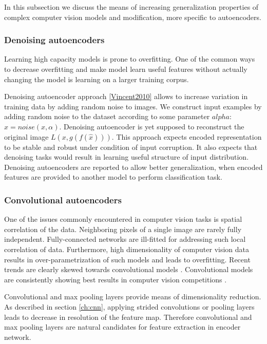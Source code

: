 In this subsection we discuss the means of increasing generalization properties of complex computer vision models and modification, more specific to autoencoders.

\subsubsection{Denoising autoencoders}

Learning high capacity models is prone to overfitting.
One of the common ways to decrease overfitting and make model learn useful features without actually changing the model is learning on a larger training corpus.

Denoising autoencoder approach \ref{Vincent2010} allows to increase variation in training data by adding random noise to images. We construct input examples by adding random noise to the dataset according to some parameter $alpha$: $\hat{x}=noise(x, \alpha)$.
Denoising autoencoder is yet supposed to reconstruct  the original image $L(x, g(f(\hat{x})))$.
This approach expects encoded representation to be stable and robust under condition of input corruption.
It also expects that denoising tasks would result in learning useful structure of input distribution.
Denoising autoencoders are reported to allow better generalization, when encoded features are provided to another model to perform classification task.

\subsubsection{Convolutional autoencoders}

One of the issues commonly encountered in computer vision tasks is spatial correlation of the data.
Neighboring pixels of a single image are rarely fully independent.
Fully-connected networks are ill-fitted for addressing such local correlation of data.
Furthermore, high dimensionality of computer vision data results in over-parametrization of such models and leads to overfitting.
Recent trends are clearly skewed towards convolutional models \cite{He2015, Szegedy2016}.
Convolutional models are consistently showing best results in computer vision competitions \cite{ILSVRC15, Zhou2016}.

Convolutional and max pooling layers provide means of dimensionality reduction.
As described in section \ref{ch:cnn}, applying strided convolutions or pooling layers leads to decrease in resolution of the feature map.
Therefore convolutional and max pooling layers are natural candidates for feature extraction in encoder network.

